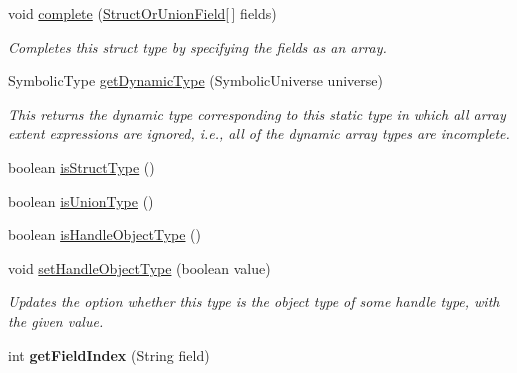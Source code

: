 \begin{DoxyCompactItemize}
void \hyperlink{classedu_1_1udel_1_1cis_1_1vsl_1_1civl_1_1model_1_1common_1_1type_1_1CommonStructOrUnionType_aff7aef2050932b25d225a3b629ac5de4}{complete} (\hyperlink{interfaceedu_1_1udel_1_1cis_1_1vsl_1_1civl_1_1model_1_1IF_1_1type_1_1StructOrUnionField}{Struct\+Or\+Union\+Field}\mbox{[}$\,$\mbox{]} fields)
\begin{DoxyCompactList}\small\item\em Completes this struct type by specifying the fields as an array. \end{DoxyCompactList}\item 
Symbolic\+Type \hyperlink{classedu_1_1udel_1_1cis_1_1vsl_1_1civl_1_1model_1_1common_1_1type_1_1CommonStructOrUnionType_a681718bff036fe6cb172b1945836f5dc}{get\+Dynamic\+Type} (Symbolic\+Universe universe)
\begin{DoxyCompactList}\small\item\em This returns the dynamic type corresponding to this static type in which all array extent expressions are ignored, i.\+e., all of the dynamic array types are incomplete. \end{DoxyCompactList}\item 
boolean \hyperlink{classedu_1_1udel_1_1cis_1_1vsl_1_1civl_1_1model_1_1common_1_1type_1_1CommonStructOrUnionType_a86b453fbd7d4b6bdb59e20cbc76e0c8e}{is\+Struct\+Type} ()
\item 
boolean \hyperlink{classedu_1_1udel_1_1cis_1_1vsl_1_1civl_1_1model_1_1common_1_1type_1_1CommonStructOrUnionType_ae9de846c1fb43406ebc9bfd5cf5af97c}{is\+Union\+Type} ()
\item 
boolean \hyperlink{classedu_1_1udel_1_1cis_1_1vsl_1_1civl_1_1model_1_1common_1_1type_1_1CommonStructOrUnionType_a35eb30a20ce0ecc516094e60aaf09158}{is\+Handle\+Object\+Type} ()
\item 
void \hyperlink{classedu_1_1udel_1_1cis_1_1vsl_1_1civl_1_1model_1_1common_1_1type_1_1CommonStructOrUnionType_a13f0c78b266e2485a675737cf0ad9468}{set\+Handle\+Object\+Type} (boolean value)
\begin{DoxyCompactList}\small\item\em Updates the option whether this type is the object type of some handle type, with the given value. \end{DoxyCompactList}\item 
\hypertarget{classedu_1_1udel_1_1cis_1_1vsl_1_1civl_1_1model_1_1common_1_1type_1_1CommonStructOrUnionType_ac00762709beca73d2f9c0b7e2af87a22}{}int {\bfseries get\+Field\+Index} (String field)\label{classedu_1_1udel_1_1cis_1_1vsl_1_1civl_1_1model_1_1common_1_1type_1_1CommonStructOrUnionType_ac00762709beca73d2f9c0b7e2af87a22}


\end{DoxyCompactItemize}
